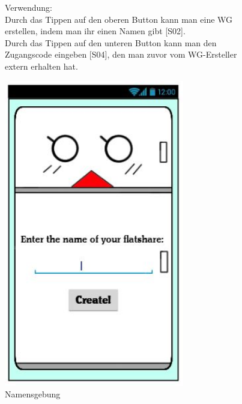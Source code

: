 \documentclass[a4paper]{scrreprt}
\begin{document}
\begin{figure}[h]
\begin{minipage}[b]{0.55\linewidth}
        		\hfill
        		
        		Verwendung:\\
        		Durch das Tippen auf den oberen Button
        		kann man eine WG erstellen, indem man ihr
        		einen Namen gibt {[}S02{]}.\\
        		Durch das Tippen auf den unteren Button kann
        		man den Zugangscode eingeben {[}S04{]}, den man zuvor vom WG-Ersteller extern erhalten 
        		hat.
        		
        	\end{minipage}
        \end{figure}
    
    	\begin{figure}[h!]
    		\begin{minipage}[t]{0.4\linewidth}
    			\flushright
    			\centering
    			\vspace{9mm}
    			\includegraphics[width=0.7\textwidth]{fridget_nameenter.JPG}
    			\caption{Namensgebung}
    			\label{fig:figure1}
    		\end{minipage}
    		\hspace{0.5cm}

\end{figure}
\end{document}
